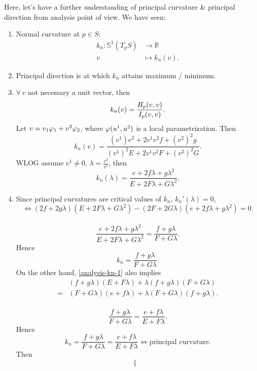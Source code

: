 Here, let's have a further understanding of principal curvature \& principal
direction from analysis point of view. We have seen:
\begin{enumerate}[(1)]
    \item Normal curvature at \(p\in S\): 
        \begin{align*}
            k_n\colon \mathbb{S}^1(T_p S) &\longrightarrow \mathbb{R} \\
            v &\longmapsto k_n(v)
        .\end{align*}
    \item Principal direction is at which \(k_n\) attains maximum / minimum.
    \item \(\forall\,v\) not necessary a unit vector, then \[
            k_n(v)=\frac{I\!I_p(v,v)}{I_p(v,v)}
        .\] 
        Let \(v=v_1\varphi_1+v^2\varphi_2\), where \(\varphi(u^1,u^2)\) is a local
        parametrization. Then \[
            k_n(v)=\frac{(v^1)e^2+2v^1v^2f+(v^2)^2g}{(v^1)^2E+2v^1v^2F+(v^2)^2G}
        .\] WLOG assume \(v^1\neq 0\), \(\lambda=\frac{v^2}{v^1}\), then \[
            k_n(\lambda)=\frac{e+2f\lambda+g\lambda^2}{E+2F\lambda+G\lambda^2}
        .\] 
    \item Since principal curvatures are critical values of \(k_n\), \(k_n'(\lambda)
        =0\), 
        \begin{equation}\label{analysis-kn-1}
            \iff (2f+2g\lambda)(E+2F\lambda+G\lambda^2)-(2F+2G\lambda)
            (e+2f\lambda+g\lambda^2)=0
        .\end{equation}
        \ie\ \[
            \frac{e+2f\lambda+g\lambda^2}{E+2F\lambda+G\lambda^2}
            =\frac{f+g\lambda}{F+G\lambda}
        .\] Hence \[
            k_n=\frac{f+g\lambda}{F+G\lambda}
        .\] On the other hand, \cref{analysis-kn-1} also implies
        \begin{equation}\label{analysis-kn-2}
        \begin{split}
            &(f+g\lambda)(E+F\lambda)+\lambda(f+g\lambda)(F+G\lambda) \\
            =&(F+G\lambda)(e+f\lambda)+\lambda(F+G\lambda)(f+g\lambda)
        .\end{split}\end{equation}
        \ie\ \[
            \frac{f+g\lambda}{F+G\lambda}=\frac{e+f\lambda}{E+F\lambda}
        .\] Hence \[
            k_n=\frac{f+g\lambda}{F+G\lambda}=\frac{e+f\lambda}{E+F\lambda}
            \iff \text{principal curvature}
        .\] Then \[
            \begin{cases}

\end{cases}\]
\end{enumerate}
